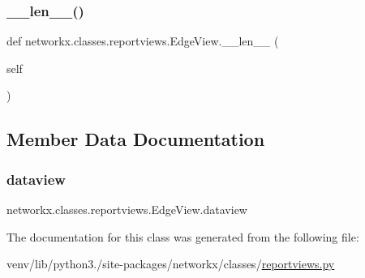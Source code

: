 \subsubsection{\texorpdfstring{\+\_\+\+\_\+len\+\_\+\+\_\+()}{\_\_len\_\_()}}
{\footnotesize\ttfamily def networkx.\+classes.\+reportviews.\+Edge\+View.\+\_\+\+\_\+len\+\_\+\+\_\+ (\begin{DoxyParamCaption}\item[{}]{self }\end{DoxyParamCaption})}



\subsection{Member Data Documentation}
\mbox{\label{classnetworkx_1_1classes_1_1reportviews_1_1EdgeView_af3b32461c8bcc6bf7f735a6534f5f681}} 
\subsubsection{\texorpdfstring{dataview}{dataview}}
{\footnotesize\ttfamily networkx.\+classes.\+reportviews.\+Edge\+View.\+dataview\hspace{0.3cm}{\ttfamily [static]}}



The documentation for this class was generated from the following file\+:\begin{DoxyCompactItemize}
\item 
venv/lib/python3./site-\/packages/networkx/classes/\hyperlink{reportviews_8py}{reportviews.\+py}\end{DoxyCompactItemize}
